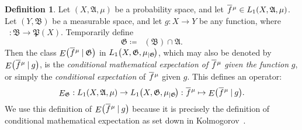 \documentclass[
twoside=true,
paper=letter,
fontsize=9pt,
pagesize=auto,
leqno,
openany,
headsepline,
overfullrule,
]{scrbook}
\theoremstyle{plain}
\theoremstyle{plain}
\theoremstyle{definition}
\newtheorem{defn}[thm]{Definition}
\theoremstyle{bfnoteitalic}
\theoremstyle{bfnoteroman}
\newcommand{\sigalg}[1]{\mathfrak{#1}}
\newcommand{\definedby}{\coloneqq}
\newcommand{\given}{\mathbin{\vert}}
\newcommand{\kondexpgvn}[2]
{\mathop{E}\bigl(#1\given#2\bigr)}
\newcommand{\kondexpop}{\mathop{E}}
\newcommand{\restrictedto}[1]{_{\lvert#1}\kern-1.5pt}
\newcommand{\preimage}[1]{\mathop{#1^{\leftarrow}}}
\newcommand{\meets}{\cap}
\newcommand{\sigmaalgebra}{\sigalg{A}}
\newcommand{\sigmaalgebraii}{\sigalg{B}}
\newcommand{\powerset}{\mathfrak{P}}
\newcommand{\function}{f}
\newcommand{\functionii}{g}
\newcommand{\measurespace}{X}
\newcommand{\measurespaceii}{Y}
\newcommand{\measure}{\mu}
\newcommand*\xbar[1]{%
   \hbox{%
     \vbox{%
       \hrule height 0.4pt %
       \kern0.4ex%
       \hbox{%
         \ensuremath{#1}%
       }%
     }%
   }%
}
\newcommand{\lebclass}[1]{\hspace{.5pt}\xbar{#1}\hspace{0.5pt}}
\newcommand{\ellclass}[2]{\lebclass{#1}^{#2}}
\begin{document}
\begin{defn}\label{cme_function}
Let $(\measurespace, \sigmaalgebra,\measure)$ be a probability space, and let
$\ellclass{\function}{\measure}\in L_1(\measurespace, \sigmaalgebra,\measure)$.
Let $(\measurespaceii, \sigmaalgebraii)$ be a measurable space, and let $\functionii:\measurespace\to\measurespaceii$ be any function, where $\preimage{\functionii}:\sigmaalgebraii\to\powerset(\measurespace)$.
Temporarily define
\[
\sigalg{G}\definedby
\preimage{\functionii}(\sigmaalgebraii)\meets\sigmaalgebra.
\]
Then the class 
$\kondexpgvn{\ellclass{\function}{\measure}}{\sigalg{G}}$
in
$L_1\bigl(\measurespace, \sigalg{G},\measure\restrictedto{\sigalg{G}}\bigr)$, 
which may also be denoted by
$\kondexpgvn{\ellclass{\function}{\measure}}{\functionii}$, is the \emph{conditional mathematical expectation of} $\ellclass{\function}{\measure}$ \emph{given the function} $\functionii$, or simply the \emph{conditional expectation} of $\ellclass{\function}{\measure}$ given $\functionii$. This defines an operator:
\[
\kondexpop\nolimits_{\sigalg{G}}
:
L_1(\measurespace, \sigmaalgebra,\measure) \to
L_1\bigl(\measurespace, 
\sigalg{G},
\measure\restrictedto{\sigalg{G}}
\bigr):
\ellclass{\function}{\measure}\mapsto \kondexpgvn{\ellclass{\function}{\measure}}{\functionii}.
\]
We use this definition of $\kondexpgvn{\ellclass{\function}{\measure}}{\functionii}$ because it is precisely the definition of conditional mathematical expectation as set down in Kolmogorov~\cite{fottop_kolmogorov_1956}. 


\end{defn}
\end{document}
